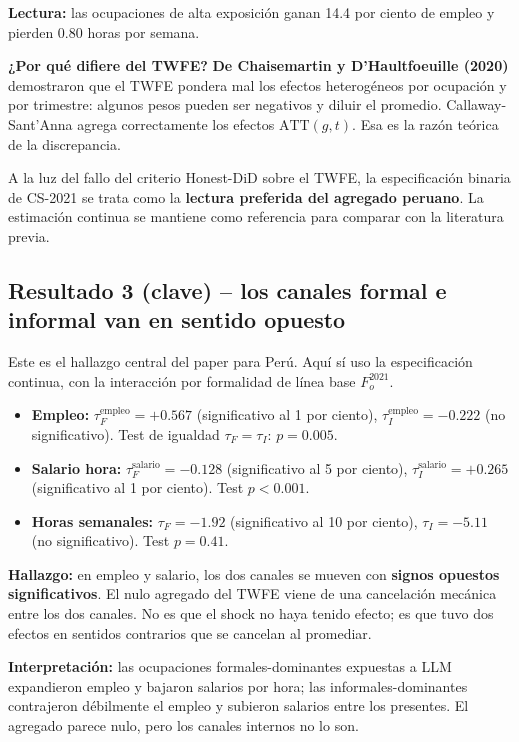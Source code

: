 \documentclass[12pt]{article}
\begin{document}
\textbf{Lectura:} las ocupaciones de alta exposición ganan 14.4 por ciento de empleo y pierden 0.80 horas por semana.

\textbf{¿Por qué difiere del TWFE?} \textbf{De Chaisemartin y D'Haultfoeuille (2020)} demostraron que el TWFE pondera mal los efectos heterogéneos por ocupación y por trimestre: algunos pesos pueden ser negativos y diluir el promedio. Callaway-Sant'Anna agrega correctamente los efectos $\text{ATT}(g, t)$. Esa es la razón teórica de la discrepancia.

A la luz del fallo del criterio Honest-DiD sobre el TWFE, la especificación binaria de CS-2021 se trata como la \textbf{lectura preferida del agregado peruano}. La estimación continua se mantiene como referencia para comparar con la literatura previa.

\subsection{Resultado 3 (clave) -- los canales formal e informal van en sentido opuesto}

Este es el hallazgo central del paper para Perú. Aquí sí uso la especificación continua, con la interacción por formalidad de línea base $F_o^{2021}$.

\begin{itemize}
  \item \textbf{Empleo:} $\tau_F^{\text{empleo}} = +0.567$ (significativo al 1 por ciento), $\tau_I^{\text{empleo}} = -0.222$ (no significativo). Test de igualdad $\tau_F = \tau_I$: $p = 0.005$.
  \item \textbf{Salario hora:} $\tau_F^{\text{salario}} = -0.128$ (significativo al 5 por ciento), $\tau_I^{\text{salario}} = +0.265$ (significativo al 1 por ciento). Test $p < 0.001$.
  \item \textbf{Horas semanales:} $\tau_F = -1.92$ (significativo al 10 por ciento), $\tau_I = -5.11$ (no significativo). Test $p = 0.41$.
\end{itemize}

\textbf{Hallazgo:} en empleo y salario, los dos canales se mueven con \textbf{signos opuestos significativos}. El nulo agregado del TWFE viene de una cancelación mecánica entre los dos canales. No es que el shock no haya tenido efecto; es que tuvo dos efectos en sentidos contrarios que se cancelan al promediar.

\begin{ideaclave}
\textbf{Interpretación:} las ocupaciones formales-dominantes expuestas a LLM expandieron empleo y bajaron salarios por hora; las informales-dominantes contrajeron débilmente el empleo y subieron salarios entre los presentes. El agregado parece nulo, pero los canales internos no lo son.
\end{ideaclave}
\end{document}
